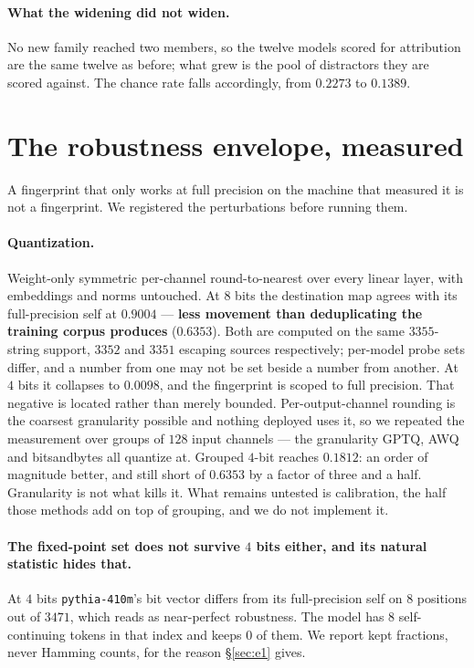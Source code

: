 \documentclass[11pt]{article}
\begin{document}
\paragraph{What the widening did not widen.} No new family reached two members, so the twelve models
scored for attribution are the same twelve as before; what grew is the pool of distractors they are
scored against. The chance rate falls accordingly, from $0.2273$ to $0.1389$.

\section{The robustness envelope, measured}\label{sec:robust}

A fingerprint that only works at full precision on the machine that measured it is not a fingerprint.
We registered the perturbations before running them.

\paragraph{Quantization.} Weight-only symmetric per-channel round-to-nearest over every linear
layer, with embeddings and norms untouched. At $8$ bits the destination map agrees with its
full-precision self at $0.9004$ --- \textbf{less movement than deduplicating the training corpus
produces} ($0.6353$). Both are computed on the same $3355$-string support, $3352$ and $3351$
escaping sources respectively; per-model probe sets differ, and a number from one may not be set
beside a number from another. At $4$ bits it collapses to $0.0098$, and the fingerprint is scoped
to full precision. That negative is located rather than merely bounded. Per-output-channel rounding
is the coarsest granularity possible and nothing deployed uses it, so we repeated the measurement
over groups of $128$ input channels --- the granularity GPTQ, AWQ and bitsandbytes all quantize at.
Grouped $4$-bit reaches $0.1812$: an order of magnitude better, and still short of $0.6353$ by a
factor of three and a half. Granularity is not what kills it. What remains untested is calibration,
the half those methods add on top of grouping, and we do not implement it.

\paragraph{The fixed-point set does not survive $4$ bits either, and its natural statistic hides
that.} At $4$ bits \texttt{pythia-410m}'s bit vector differs from its full-precision self on $8$
positions out of $3471$, which reads as near-perfect robustness. The model has $8$ self-continuing
tokens in that index and keeps $0$ of them. We report kept fractions, never Hamming counts, for the
reason \S\ref{sec:e1} gives.
\end{document}
